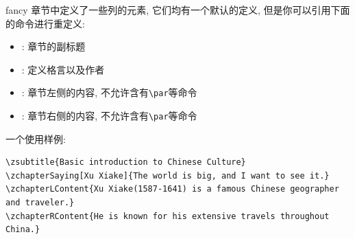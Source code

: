 fancy 章节中定义了一些列的元素, 它们均有一个默认的定义, 但是你可以引用下面的命令进行重定义:
\begin{itemize}
  \item {}: 章节的副标题
  \item {}: 定义格言以及作者
  \item {}: 章节左侧的内容, 不允许含有\texttt{\textbackslash par}等命令
  \item {}: 章节右侧的内容, 不允许含有\texttt{\textbackslash par}等命令
\end{itemize}

一个使用样例:
\begin{verbatim}
\zsubtitle{Basic introduction to Chinese Culture}
\zchapterSaying[Xu Xiake]{The world is big, and I want to see it.}
\zchapterLContent{Xu Xiake(1587-1641) is a famous Chinese geographer and traveler.}
\zchapterRContent{He is known for his extensive travels throughout China.}
\end{verbatim}

